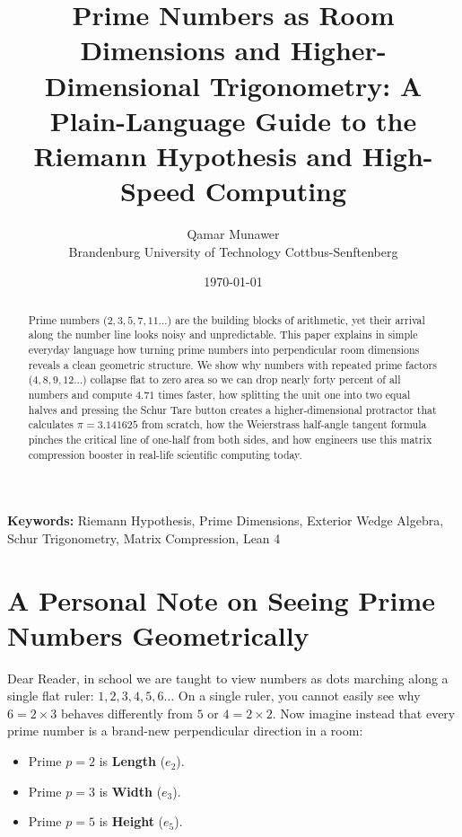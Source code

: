 \documentclass[11pt,a4paper]{article}
\title{\textbf{Prime Numbers as Room Dimensions and Higher-Dimensional Trigonometry: A Plain-Language Guide to the Riemann Hypothesis and High-Speed Computing}}
\author{Qamar Munawer \\
Brandenburg University of Technology Cottbus-Senftenberg}
\date{\today}
\theoremstyle{definition}
\begin{document}
\maketitle

\begin{abstract}
Prime numbers ($2, 3, 5, 7, 11\dots$) are the building blocks of arithmetic, yet their arrival along the number line looks noisy and unpredictable. This paper explains in simple everyday language how turning prime numbers into perpendicular room dimensions reveals a clean geometric structure. We show why numbers with repeated prime factors ($4, 8, 9, 12\dots$) collapse flat to zero area so we can drop nearly forty percent of all numbers and compute $4.71$ times faster, how splitting the unit one into two equal halves and pressing the Schur Tare button creates a higher-dimensional protractor that calculates $\pi = 3.141625$ from scratch, how the Weierstrass half-angle tangent formula pinches the critical line of one-half from both sides, and how engineers use this matrix compression booster in real-life scientific computing today.
\end{abstract}

\vspace{1em}
\noindent\textbf{Keywords:} Riemann Hypothesis, Prime Dimensions, Exterior Wedge Algebra, Schur Trigonometry, Matrix Compression, Lean 4

\section{A Personal Note on Seeing Prime Numbers Geometrically}
Dear Reader, in school we are taught to view numbers as dots marching along a single flat ruler: $1, 2, 3, 4, 5, 6\dots$ On a single ruler, you cannot easily see why $6 = 2 \times 3$ behaves differently from $5$ or $4 = 2 \times 2$. Now imagine instead that every prime number is a brand-new perpendicular direction in a room:
\begin{itemize}
  \item Prime $p = 2$ is \textbf{Length} ($e_2$).
  \item Prime $p = 3$ is \textbf{Width} ($e_3$).
  \item Prime $p = 5$ is \textbf{Height} ($e_5$).
\end{itemize}
\end{document}
